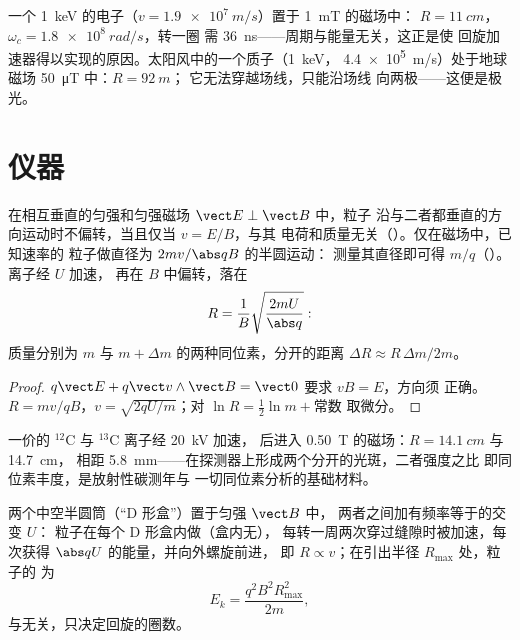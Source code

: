 \begin{example}[数量级]\label{ex:b1:charged-particles:orders}
一个 \qty{1}{keV} 的电子（$v = \qty{1.9e7}{m/s}$）置于 \qty{1}{mT} 的磁场中：
$R = \qty{11}{cm}$，$\omega_c = \qty{1.8e8}{rad/s}$，转一圈
需 \qty{36}{ns}——周期与能量无关，这正是使
回旋加速器得以实现的原因。太阳风中的一个质子（\qty{1}{keV}，
\qty{4.4e5}{m/s}）处于地球磁场 \qty{50}{\micro T} 中：$R = \qty{92}{m}$；
它无法穿越场线，只能沿场线
向两极——这便是极光。
\end{example}

\section{仪器}

\begin{proposition}[速度选择器与质谱仪]\label{prop:b1:charged-particles:spectrometer}
在相互垂直的匀强和匀强磁场 $\vect E \perp \vect B$ 中，粒子
沿与二者都垂直的方向运动时不偏转，当且仅当 $v = E/B$，与其
电荷和质量无关（\emph{}）。仅在磁场中，已知速率的
粒子做直径为 $2mv/\abs qB$ 的半圆运动：
测量其直径即可得 $m/q$（\emph{}）。离子经 $U$ 加速，
再在 $B$ 中偏转，落在
\[
R = \frac{1}{B}\sqrt{\frac{2mU}{\abs q}} :
\]
质量分别为 $m$ 与 $m + \Delta m$ 的两种同位素，分开的距离 $\Delta R \approx
R\,\Delta m/2m$。
\end{proposition}

\begin{proof}
$q\vect E + q\vect v\wedge\vect B = \vect 0$ 要求 $vB = E$，方向须
正确。$R = mv/qB$，$v = \sqrt{2qU/m}$；对
$\ln R = \tfrac12\ln m + \text{常数}$ 取微分。
\end{proof}

\begin{example}[碳同位素]\label{ex:b1:charged-particles:isotopes}
一价的 $^{12}$C 与 $^{13}$C 离子经 \qty{20}{kV} 加速，
后进入 \qty{0.50}{T} 的磁场：$R = \qty{14.1}{cm}$ 与 \qty{14.7}{cm}，
相距 \qty{5.8}{mm}——在探测器上形成两个分开的光斑，二者强度之比
即同位素丰度，是放射性碳测年与
一切同位素分析的基础材料。
\end{example}

\begin{proposition}[回旋加速器]\label{prop:b1:charged-particles:cyclotron}
两个中空半圆筒（“D 形盒”）置于匀强 $\vect B$ 中，
两者之间加有频率等于的交变 $U$：
粒子在每个 D 形盒内做（盒内无），
每转一周两次穿过缝隙时被加速，每次获得 $\abs qU$ 的能量，并向外螺旋前进，
即 $R \propto v$；在引出半径 $R_{\max}$ 处，粒子的
为
\[
E_k = \frac{q^2B^2R_{\max}^2}{2m},
\]
与无关，只决定回旋的圈数。
\end{proposition}

